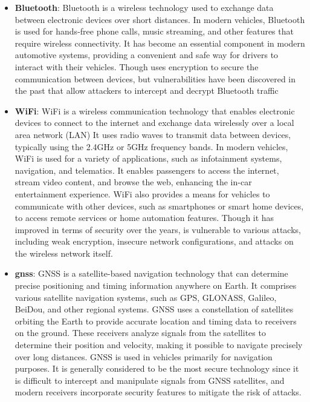 \begin{itemize}
    \item \textbf{Bluetooth}: Bluetooth is a wireless technology used to exchange data between electronic devices over short distances.
    In modern vehicles, Bluetooth is used for hands-free phone calls, music streaming, and other features that require wireless connectivity. 
    It has become an essential component in modern automotive systems, providing a convenient and safe way for drivers to interact with their vehicles.
    Though uses encryption to secure the communication between devices, but vulnerabilities have been discovered in the past that allow attackers to intercept and decrypt Bluetooth traffic

    \item \textbf{WiFi}: WiFi is a wireless communication technology that enables electronic devices to connect to the internet and exchange data wirelessly over a local area network (LAN)
    It uses radio waves to transmit data between devices, typically using the 2.4GHz or 5GHz frequency bands.
    In modern vehicles, WiFi is used for a variety of applications, such as infotainment systems, navigation, and telematics. 
    It enables passengers to access the internet, stream video content, and browse the web, enhancing the in-car entertainment experience. 
    WiFi also provides a means for vehicles to communicate with other devices, such as smartphones or smart home devices, to access remote services or home automation features.
    Though it has improved in terms of security over the years, is vulnerable to various attacks, including weak encryption, insecure network configurations, and attacks on the wireless network itself.

    \item \textbf{\gls{gnss}}: GNSS is a satellite-based navigation technology that can determine precise positioning and timing information anywhere on Earth. 
    It comprises various satellite navigation systems, such as GPS, GLONASS, Galileo, BeiDou, and other regional systems.
    GNSS uses a constellation of satellites orbiting the Earth to provide accurate location and timing data to receivers on the ground. 
    These receivers analyze signals from the satellites to determine their position and velocity, making it possible to navigate precisely over long distances.
    GNSS is used in vehicles primarily for navigation purposes.
    It is generally considered to be the most secure technology since it is difficult to intercept and manipulate signals from GNSS satellites, 
    and modern receivers incorporate security features to mitigate the risk of attacks.
\end{itemize}
    
